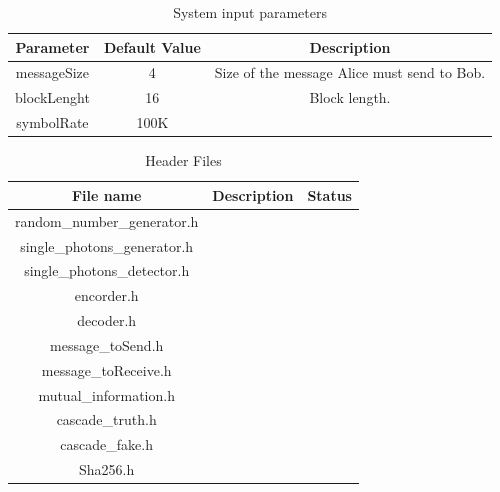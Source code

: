\begin{table}[H]
\centering
\caption{System input parameters}
\label{my-label}
\begin{tabular}{|c|c|c|}
\hline
\textbf{Parameter} & \textbf{Default Value} & \textbf{Description}                   \\ \hline
messageSize                              & 4                                           & Size of the message Alice must send to Bob.\\ \hline
blockLenght                              & 16                                          & Block length.                                                  \\ \hline
symbolRate                               & 100K                                        &                                                 \\ \hline
\end{tabular}
\end{table}

\begin{table}[H]
\centering
\caption{Header Files}
\label{tab:headerfiles}
\begin{tabular}{|c|c|c|}
\hline
\textbf{File name}           & \textbf{Description}  & \textbf{Status}       \\ \hline
random\_number\_generator.h  &                       &                       \\ \hline
single\_photons\_generator.h &                       &                       \\ \hline
single\_photons\_detector.h  &                       &                       \\ \hline
encorder.h                   &                       &                       \\ \hline
decoder.h                    &                       &                       \\ \hline
message\_toSend.h              &                       &                       \\ \hline
message\_toReceive.h           &                       &                       \\ \hline
mutual\_information.h        &                       &                       \\ \hline
cascade\_truth.h               &                       &                       \\ \hline
cascade\_fake.h                &                       &                       \\ \hline
Sha256.h                     &                       &                       \\ \hline
\end{tabular}
\end{table}

